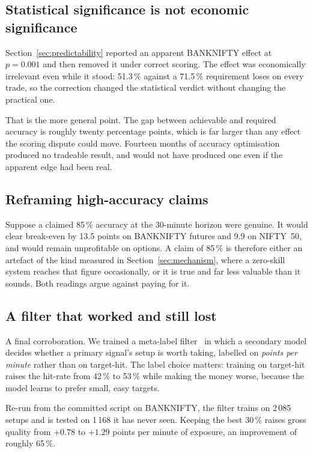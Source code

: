 \documentclass[conference]{IEEEtran}
\begin{document}
\subsection{Statistical significance is not economic significance}

Section~\ref{sec:predictability} reported an apparent BANKNIFTY effect at
$p = 0.001$ and then removed it under correct scoring. The effect was economically irrelevant even while it stood: 51.3\,\% against a
71.5\,\% requirement loses on every trade, so the correction changed the
statistical verdict without changing the practical one.

That is the more general point. The gap between achievable and required accuracy
is roughly twenty percentage points, which is far larger than any effect the
scoring dispute could move. Fourteen months of accuracy optimisation produced no
tradeable result, and would not have produced one even if the apparent edge had
been real.

\subsection{Reframing high-accuracy claims}

Suppose a claimed 85\,\% accuracy at the 30-minute horizon were genuine. It
would clear break-even by 13.5 points on BANKNIFTY futures and 9.9 on NIFTY~50,
and would remain unprofitable on options. A claim of 85\,\% is therefore either
an artefact of the kind measured in Section~\ref{sec:mechanism}, where a
zero-skill system reaches that figure occasionally, or it is true and far less
valuable than it sounds. Both readings argue against paying for it.

\subsection{A filter that worked and still lost}

A final corroboration. We trained a meta-label filter~\cite{prado2018} in which
a secondary model decides whether a primary signal's setup is worth taking,
labelled on \emph{points per minute} rather than on target-hit. The label choice
matters: training on target-hit raises the hit-rate from 42\,\% to 53\,\% while
making the money worse, because the model learns to prefer small, easy targets.

Re-run from the committed script on BANKNIFTY, the filter trains on 2\,085
setups and is tested on 1\,168 it has never seen. Keeping the best 30\,\% raises
gross quality from $+0.78$ to $+1.29$ points per minute of exposure, an
improvement of roughly 65\,\%.
\end{document}

